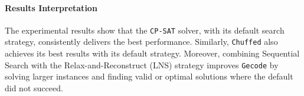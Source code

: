 \begin{table}[htbp]
\centering
\small
{}
\caption{Objective values using \textit{Relax-and-Reconstruct (LNS) Strategy}}
\end{table}
\paragraph{Results Interpretation}

The experimental results show that the \texttt{CP-SAT} solver, with its default search strategy, consistently delivers the best performance. Similarly, \texttt{Chuffed} also achieves its best results with its default strategy. Moreover, combining Sequential Search with the Relax-and-Reconstruct (LNS) strategy improves \texttt{Gecode} by solving larger instances and finding valid or optimal solutions where the default did not succeed.


